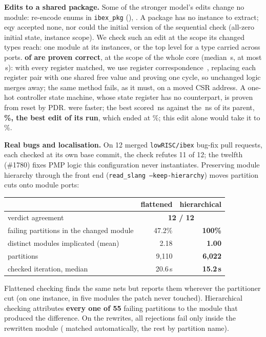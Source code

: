 \documentclass[sigconf,nonacm]{acmart}
\begin{document}
\textbf{Edits to a shared package.} Some of the stronger model's edits change no
module: \PKGn{} re-encode enums in \texttt{ibex\_pkg} (\PKGenums),
\PKGrunsText. A package has no instance to extract; eqy accepted none, nor could
the initial version of the sequential check (all-zero initial state, instance
scope). We check such an edit at the scope its changed types reach: one module
at its instances, or the top level for a type carried across ports. \textbf{\PKGproven{} of \PKGn{} are proven correct},
\PKGtopProven{} at the scope of the whole core (median \PKGtopS\,s, at most
\PKGtopMax\,s): with every register matched, we use register
correspondence~\cite{vaneijk}, replacing each register pair with one shared free
value and proving one cycle, so unchanged logic merges away; the same method
fails, as it must, on a moved CSR address. A one-hot controller state machine,
whose state register has no counterpart, is proven from reset by PDR.
\PKGfast{} were faster; the best scored \PKGbestNs\,ns against the
\PKGbestParent\,ns of its parent, \textbf{\PKGbestPct\%, the best edit of its
run}, which ended at \PKGrunPct\%; this edit alone would take it to
\PKGrunWould\%.

\textbf{Real bugs and localisation.} On 12 merged
\texttt{lowRISC/\allowbreak ibex} bug-fix pull requests, each checked at its own
base commit, the check refutes 11 of 12; the twelfth (\#1780) fixes PMP logic
this configuration never instantiates. Preserving module hierarchy through the
front end (\texttt{read\_slang --keep-hierarchy}) moves partition cuts onto
module ports:

\begin{center}\small
\begin{tabular}{@{}lrr@{}}
\toprule
 & flattened & hierarchical \\
\midrule
verdict agreement & \multicolumn{2}{c}{\textbf{12 / 12}} \\
failing partitions in the changed module & 47.2\% & \textbf{100\%} \\
distinct modules implicated (mean) & 2.18 & \textbf{1.00} \\
partitions & 9{,}110 & \textbf{6{,}022} \\
checked iteration, median & 20.6\,s & \textbf{15.2\,s} \\
\bottomrule
\end{tabular}
\end{center}

Flattened checking finds the same nets but reports them wherever the
partitioner cut (on one instance, in five modules the patch never touched).
Hierarchical checking attributes \textbf{every one of 55} failing partitions to
the module that produced the difference. On the rewrites, all \RWbroken{}
rejections fail only inside the rewritten module (\RWloc{} matched
automatically, the rest by partition name).
\end{document}
